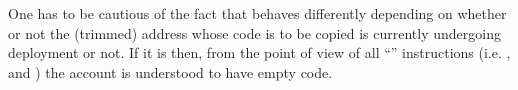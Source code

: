 \hypertarget{note: EXT instruction precautions}{\saNote{}
One has to be cautious of the fact that  behaves differently depending on whether or not the (trimmed) address whose code is to be copied is currently undergoing deployment or not.
If it is then, from the point of view of all ``'' instructions (i.e. ,  and ) the account is understood to have empty code.}
